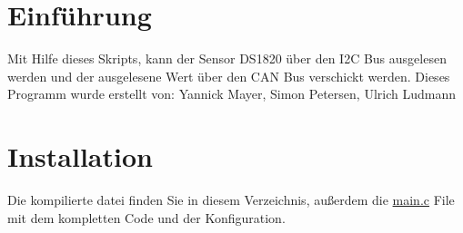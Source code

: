 \hypertarget{index_intro_sec}{}\section{Einführung}\label{index_intro_sec}
Mit Hilfe dieses Skripts, kann der Sensor D\+S1820 über den I2C Bus ausgelesen werden und der ausgelesene Wert über den C\+AN Bus verschickt werden. Dieses Programm wurde erstellt von\+: Yannick Mayer, Simon Petersen, Ulrich Ludmann \hypertarget{index_install_sec}{}\section{Installation}\label{index_install_sec}
Die kompilierte datei finden Sie in diesem Verzeichnis, außerdem die \hyperlink{main_8c}{main.\+c} File mit dem kompletten Code und der Konfiguration. 
